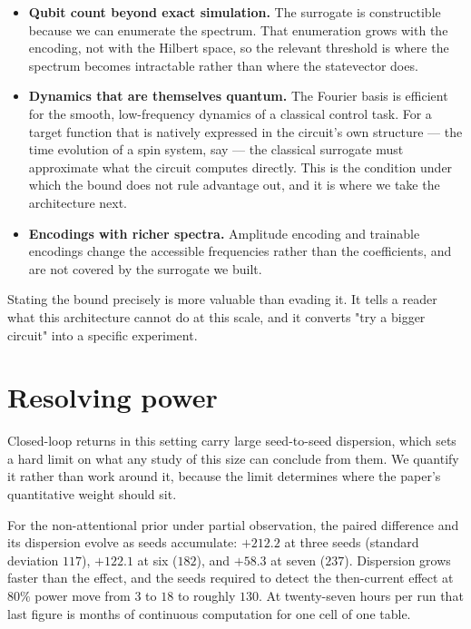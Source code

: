 \documentclass[11pt,onecolumn]{article}
\begin{document}
\begin{itemize}\itemsep3pt
\item \textbf{Qubit count beyond exact simulation.} The surrogate is
      constructible because we can enumerate the spectrum. That
      enumeration grows with the encoding, not with the Hilbert space,
      so the relevant threshold is where the spectrum becomes
      intractable rather than where the statevector does.
\item \textbf{Dynamics that are themselves quantum.} The Fourier basis
      is efficient for the smooth, low-frequency dynamics of a classical
      control task. For a target function that is natively expressed in
      the circuit's own structure --- the time evolution of a spin
      system, say --- the classical surrogate must approximate what the
      circuit computes directly. This is the condition under which the
      bound does not rule advantage out, and it is where we take the
      architecture next.
\item \textbf{Encodings with richer spectra.} Amplitude encoding and
      trainable encodings change the accessible frequencies rather than
      the coefficients, and are not covered by the surrogate we built.
\end{itemize}

Stating the bound precisely is more valuable than evading it. It tells a
reader what this architecture cannot do at this scale, and it converts
"try a bigger circuit" into a specific experiment.

\section{Resolving power}\label{sec:power}
Closed-loop returns in this setting carry large seed-to-seed dispersion,
which sets a hard limit on what any study of this size can conclude from
them. We quantify it rather than work around it, because the limit
determines where the paper's quantitative weight should sit.

For the non-attentional prior under partial observation, the paired
difference and its dispersion evolve as seeds accumulate: $+212.2$ at
three seeds (standard deviation $117$), $+122.1$ at six ($182$), and
$+58.3$ at seven ($237$). Dispersion grows faster than the effect, and
the seeds required to detect the then-current effect at $80\%$ power
move from $3$ to $18$ to roughly $130$. At twenty-seven hours per run
that last figure is months of continuous computation for one cell of one
table.
\end{document}
